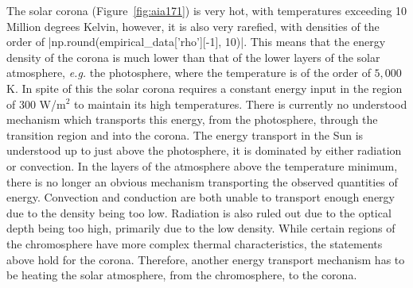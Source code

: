 The solar corona (Figure~\ref{fig:aia171}) is very hot, with temperatures exceeding 10 Million degrees Kelvin, however, it is also very rarefied, with densities of the order of \py[chapter1]|np.round(empirical_data['rho'][-1], 10)|.
This means that the energy density of the corona is much lower than that of the lower layers of the solar atmosphere, \textit{e.g.} the photosphere, where the temperature is of the order of $5,000$ K.
In spite of this the solar corona requires a constant energy input in the region of $300$ W/m$^2$ \citep{priest2014} to maintain its high temperatures.
There is currently no understood mechanism which transports this energy, from the photosphere, through the transition region and into the corona.
The energy transport in the Sun is understood up to just above the photosphere, it is dominated by either radiation or convection.
In the layers of the atmosphere above the temperature minimum, there is no longer an obvious mechanism transporting the observed quantities of energy.
Convection and conduction are both unable to transport enough energy due to the density being too low.
Radiation is also ruled out due to the optical depth being too high, primarily due to the low density.
While certain regions of the chromosphere have more complex thermal characteristics, the statements above hold for the corona.
Therefore, another energy transport mechanism has to be heating the solar atmosphere, from the chromosphere, to the corona.



